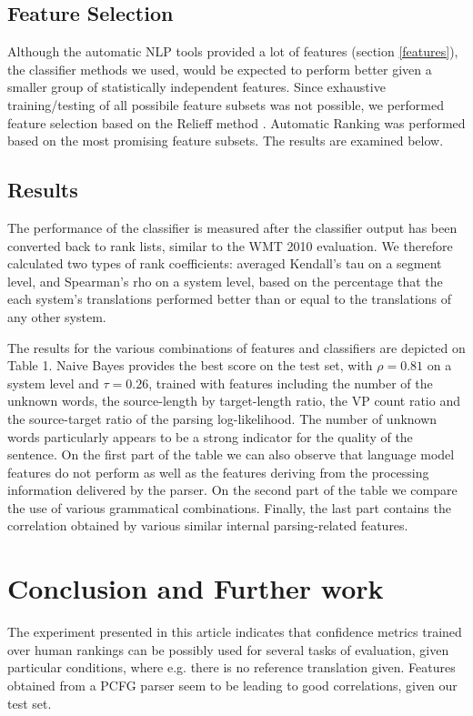 \documentclass[11pt]{article}
\begin{document}
\subsection{Feature Selection}
Although the automatic NLP tools provided a
lot of features (section \ref{features}), the classifier methods we used, would
be expected to perform better given a smaller group of statistically independent
features. Since exhaustive training/testing of all possibile feature subsets 
was not possible, we performed feature selection based on the Relieff method
\cite{Kononenko94estimatingattributes:,kira1992feature}. Automatic Ranking was
performed based on the most promising feature subsets. The results are examined below.

\subsection{Results}
The performance of the classifier is measured after the classifier
output has been converted back to rank lists, similar to the WMT 2010
evaluation. We therefore calculated two types of rank coefficients: averaged
Kendall's tau on a segment level, and Spearman's rho on a system level, based
on the percentage that the each system's translations performed better than or equal to the translations
of any other system.

The results for the various combinations of features and classifiers are
depicted on Table 1. Naive Bayes provides the best score on the test set, with
$\rho = 0.81$ on a system level and $\tau = 0.26$, trained with features
including the number of the unknown words, the source-length by target-length
ratio, the VP count ratio and the source-target ratio of the parsing
log-likelihood. The number of unknown words particularly appears to be a strong indicator for the quality of
the sentence. On the first part of the table we can also observe that language
model features do not perform as well as the features deriving from the
processing information delivered by the parser. On the second part of the table
we compare the use of various grammatical combinations. Finally, the last part
contains the correlation obtained by various similar internal parsing-related features.

\section {Conclusion and Further work}
The experiment presented in this article indicates that confidence metrics
trained over human rankings can be possibly used for several tasks of
evaluation, given particular conditions, where e.g. there is no reference
translation given. Features obtained from a PCFG parser seem to be
leading to good correlations, given our test set. 
\end{document}
